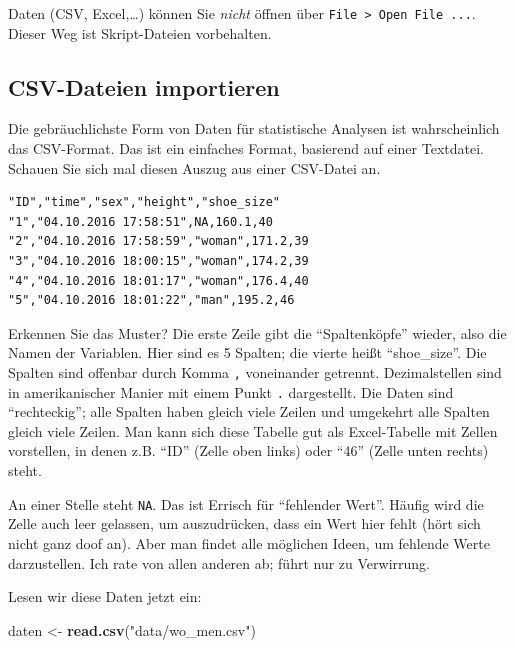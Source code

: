 \documentclass[12pt,ngerman,]{book}
\makeatletter
\newenvironment{Shaded}{\begin{snugshade}}{\end{snugshade}}
\newcommand{\KeywordTok}[1]{\textcolor[rgb]{0.13,0.29,0.53}{\textbf{{#1}}}}
\newcommand{\StringTok}[1]{\textcolor[rgb]{0.31,0.60,0.02}{{#1}}}
\newcommand{\NormalTok}[1]{{#1}}
\newenvironment{kframe}{%
\medskip{}
\setlength{\fboxsep}{.8em}
 \def\at@end@of@kframe{}%
 \ifinner\ifhmode%
  \def\at@end@of@kframe{\end{minipage}}%
  \begin{minipage}{\columnwidth}%
 \fi\fi%
 \def\FrameCommand##1{\hskip\@totalleftmargin \hskip-\fboxsep
 \colorbox{shadecolor}{##1}\hskip-\fboxsep
     \hskip-\linewidth \hskip-\@totalleftmargin \hskip\columnwidth}%
 \MakeFramed {\advance\hsize-\width
   \@totalleftmargin\z@ \linewidth\hsize
   \@setminipage}}%
 {\par\unskip\endMakeFramed%
 \at@end@of@kframe}
\renewenvironment{Shaded}{\begin{kframe}}{\end{kframe}}
\let\BeginKnitrBlock\begin \let\EndKnitrBlock\end
\makeatother
\begin{document}
\BeginKnitrBlock{rmdcaution}
Daten (CSV, Excel,\ldots{}) können Sie \emph{nicht} öffnen über
\texttt{File\ \textgreater{}\ Open\ File\ ...}. Dieser Weg ist
Skript-Dateien vorbehalten.
\EndKnitrBlock{rmdcaution}

\subsection{CSV-Dateien importieren}\label{csv-dateien-importieren}

Die gebräuchlichste Form von Daten für statistische Analysen ist
wahrscheinlich das CSV-Format. Das ist ein einfaches Format, basierend
auf einer Textdatei. Schauen Sie sich mal diesen Auszug aus einer
CSV-Datei an.

\begin{verbatim}
"ID","time","sex","height","shoe_size"
"1","04.10.2016 17:58:51",NA,160.1,40
"2","04.10.2016 17:58:59","woman",171.2,39
"3","04.10.2016 18:00:15","woman",174.2,39
"4","04.10.2016 18:01:17","woman",176.4,40
"5","04.10.2016 18:01:22","man",195.2,46
\end{verbatim}

Erkennen Sie das Muster? Die erste Zeile gibt die ``Spaltenköpfe''
wieder, also die Namen der Variablen. Hier sind es 5 Spalten; die vierte
heißt ``shoe\_size''. Die Spalten sind offenbar durch Komma \texttt{,}
voneinander getrennt. Dezimalstellen sind in amerikanischer Manier mit
einem Punkt \texttt{.} dargestellt. Die Daten sind ``rechteckig''; alle
Spalten haben gleich viele Zeilen und umgekehrt alle Spalten gleich
viele Zeilen. Man kann sich diese Tabelle gut als Excel-Tabelle mit
Zellen vorstellen, in denen z.B. ``ID'' (Zelle oben links) oder ``46''
(Zelle unten rechts) steht.

An einer Stelle steht \texttt{NA}. Das ist Errisch für ``fehlender
Wert''. Häufig wird die Zelle auch leer gelassen, um auszudrücken, dass
ein Wert hier fehlt (hört sich nicht ganz doof an). Aber man findet alle
möglichen Ideen, um fehlende Werte darzustellen. Ich rate von allen
anderen ab; führt nur zu Verwirrung.

Lesen wir diese Daten jetzt ein:

\begin{Shaded}
\begin{Highlighting}[]
\NormalTok{daten <-}\StringTok{ }\KeywordTok{read.csv}\NormalTok{(}\StringTok{"data/wo_men.csv"}\NormalTok{)}
\end{Highlighting}
\end{Shaded}
\end{document}
